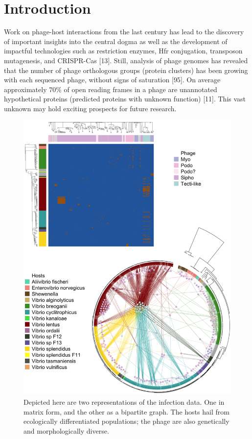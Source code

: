 \documentclass[12pt,twoside]{mitthesis-manusdown}
\begin{document}
\section{Introduction}\label{introduction-2}

Work on phage-host interactions from the last century has lead to the
discovery of important insights into the central dogma as well as the
development of impactful technologies such as restriction enzymes, Hfr
conjugation, transposon mutagenesis, and CRISPR-Cas {[}13{]}. Still,
analysis of phage genomes has revealed that the number of phage
orthologous groups (protein clusters) has been growing with each
sequenced phage, without signs of saturation {[}95{]}. On average
approximately 70\% of open reading frames in a phage are unannotated
hypothetical proteins (predicted proteins with unknown function)
{[}11{]}. This vast unknown may hold exciting prospects for future
research.
\begin{figure}[tb!]

{\centering \includegraphics[width=0.7\linewidth]{figurespred/figIntro} 

}

\caption{\label{fig:figIntro}Depicted here are two representations of the infection data. One in matrix form, and the other as a bipartite graph. The hosts hail from ecologically differentiated populations; the phage are also genetically and morphologically diverse.}\label{fig:figIntro}
\end{figure}
\end{document}
